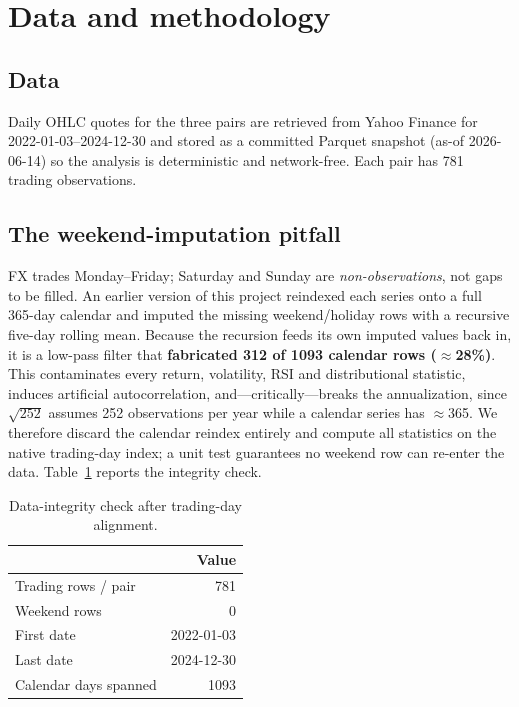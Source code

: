\documentclass[11pt,a4paper]{article}
\begin{document}
\section{Data and methodology}
\subsection{Data}
Daily OHLC quotes for the three pairs are retrieved from Yahoo Finance for 2022-01-03--2024-12-30 and stored as a
committed Parquet snapshot (as-of 2026-06-14) so the analysis is deterministic and network-free. Each pair has
781 trading observations.
\subsection{The weekend-imputation pitfall}
FX trades Monday--Friday; Saturday and Sunday are \emph{non-observations}, not gaps to be filled.
An earlier version of this project reindexed each series onto a full 365-day calendar and imputed the
missing weekend/holiday rows with a recursive five-day rolling mean. Because the recursion feeds its
own imputed values back in, it is a low-pass filter that \textbf{fabricated 312 of 1093 calendar rows
($\approx$28\%)}. This contaminates every return, volatility, RSI and distributional statistic, induces
artificial autocorrelation, and---critically---breaks the annualization, since $\sqrt{252}$ assumes 252
observations per year while a calendar series has $\approx$365. We therefore discard the calendar
reindex entirely and compute all statistics on the native trading-day index; a unit test guarantees no
weekend row can re-enter the data. Table~\ref{tab:integrity} reports the integrity check.
\begin{table}[H]\centering
\small
\caption{Data-integrity check after trading-day alignment.}\label{tab:integrity}
\begin{tabular}{lr}
\toprule
 & Value \\
\midrule
Trading rows / pair & 781 \\
Weekend rows & 0 \\
First date & 2022-01-03 \\
Last date & 2024-12-30 \\
Calendar days spanned & 1093 \\
\bottomrule
\end{tabular}
\end{table}
\end{document}
